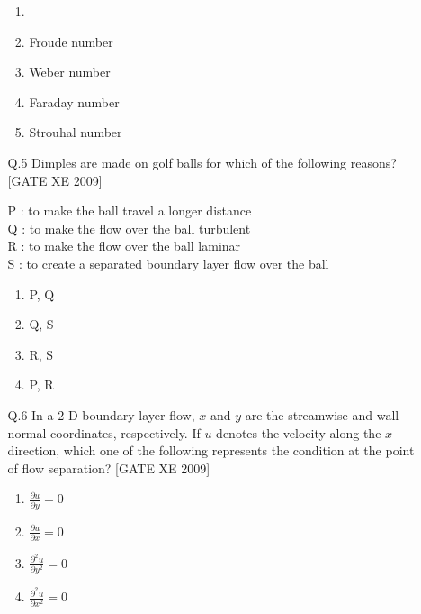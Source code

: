 \documentclass[journal,12pt,onecolumn]{IEEEtran}
\theoremstyle{remark}
\begin{document}
\begin{enumerate}
\begin{enumerate}
\begin{multicols}{2}
\begin{enumerate}
       \item 


     \item  Froude number 
     \item  Weber number
     \item  Faraday number
     \item  Strouhal number
\end{enumerate} 
 \end{multicols}


 \item[Q.5] Dimples are made on golf balls for which of the following reasons?\hfill[GATE XE 2009]

\vspace{1em}

\noindent
P : to make the ball travel a longer distance \\
Q : to make the flow over the ball turbulent \\
R : to make the flow over the ball laminar \\
S : to create a separated boundary layer flow over the ball

\vspace{1em}

\begin{multicols}{4}
\begin{enumerate}
\item P, Q
\item Q, S 
\item R, S 
\item P, R 
\end{enumerate} 
 \end{multicols}

\item [Q.6]In a 2-D boundary layer flow, $x$ and $y$ are the streamwise and wall-normal coordinates, respectively. If $u$ denotes the velocity along the $x$ direction, which one of the following represents the condition at the point of flow separation?
\hfill[GATE XE 2009]\\
\begin{multicols}{4}
\begin{enumerate}
    \item $\frac{\partial u}{\partial y} = 0$
   \item $\frac{\partial u}{\partial x} = 0$
   \item $\frac{\partial^2 u}{\partial y^2} = 0$
   \item $\frac{\partial^2 u}{\partial x^2} = 0$
\end{enumerate} 
 \end{multicols}


\end{enumerate}
\end{enumerate}
\end{document}
